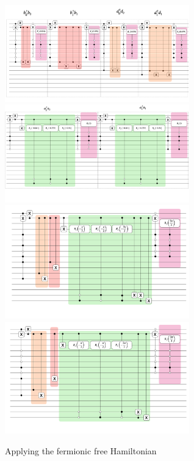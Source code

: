 \begin{figure}[h]
    \includegraphics[width = 8cm]{figures/fermi_free.png}
    \includegraphics[width = 8cm]{figures/bose_free.png}
    \includegraphics[width = 8cm]{figures/pair_create.png}
    \includegraphics[width = 8cm]{figures/pair_annihilate.png}
    \caption{Applying the fermionic free Hamiltonian}
\end{figure}
